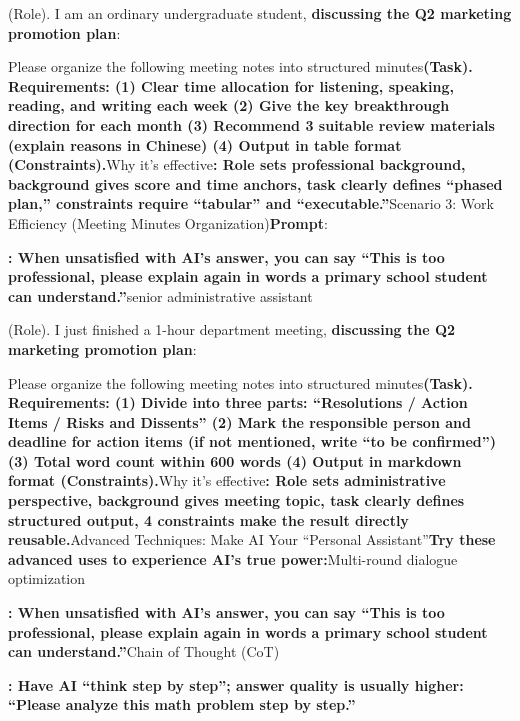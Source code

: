 \begin{tcbinfo}{(Role). I am an ordinary undergraduate student,}
\textbf{discussing the Q2 marketing promotion plan}:

Please organize the following meeting notes into structured minutes\textbf{(Task). Requirements: (1) Clear time allocation for listening, speaking, reading, and writing each week (2) Give the key breakthrough direction for each month (3) Recommend 3 suitable review materials (explain reasons in Chinese) (4) Output in table format (Constraints).}Why it's effective\textbf{: Role sets professional background, background gives score and time anchors, task clearly defines “phased plan,” constraints require “tabular” and “executable.”}Scenario 3: Work Efficiency (Meeting Minutes Organization)\textbf{Prompt}:

\textbf{: When unsatisfied with AI's answer, you can say “This is too professional, please explain again in words a primary school student can understand.”}senior administrative assistant

\end{tcbinfo}

\begin{tcbinfo}{(Role). I just finished a 1-hour department meeting,}
\textbf{discussing the Q2 marketing promotion plan}:

Please organize the following meeting notes into structured minutes\textbf{(Task). Requirements: (1) Divide into three parts: “Resolutions / Action Items / Risks and Dissents” (2) Mark the responsible person and deadline for action items (if not mentioned, write “to be confirmed”) (3) Total word count within 600 words (4) Output in markdown format (Constraints).}Why it's effective\textbf{: Role sets administrative perspective, background gives meeting topic, task clearly defines structured output, 4 constraints make the result directly reusable.}Advanced Techniques: Make AI Your “Personal Assistant”\textbf{Try these advanced uses to experience AI's true power:}Multi-round dialogue optimization

\textbf{: When unsatisfied with AI's answer, you can say “This is too professional, please explain again in words a primary school student can understand.”}Chain of Thought (CoT)

\end{tcbinfo}

\textbf{: Have AI “think step by step”; answer quality is usually higher: “Please analyze this math problem step by step.”}\par

